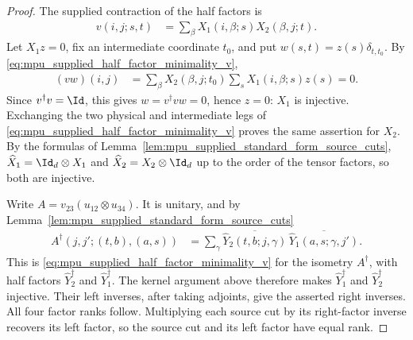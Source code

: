 \begin{proof}\leanok
    The supplied contraction of the half factors is
    \begin{align}
        v(i,j;s,t) & =\sum_\beta X_1(i,\beta;s)X_2(\beta,j;t).
        \label{eq:mpu_supplied_half_factor_minimality_v}
    \end{align}
    Let $X_1z=0$, fix an intermediate coordinate $t_0$, and put
    $w(s,t)=z(s)\delta_{t,t_0}$. By
    \eqref{eq:mpu_supplied_half_factor_minimality_v},
    \begin{align}
        (vw)(i,j) & =\sum_\beta X_2(\beta,j;t_0)
        \sum_sX_1(i,\beta;s)z(s)=0.
    \end{align}
    Since $v^\dagger v=\Id$, this gives $w=v^\dagger vw=0$, hence $z=0$:
    $X_1$ is injective. Exchanging the two physical and intermediate legs
    of \eqref{eq:mpu_supplied_half_factor_minimality_v} proves the same
    assertion for $X_2$. By the formulas of
    Lemma~\ref{lem:mpu_supplied_standard_form_source_cuts},
    $\widehat X_1=\Id_d\otimes X_1$ and $\widehat X_2=X_2\otimes\Id_d$
    up to the order of the tensor factors, so both are injective.

    Write $A=v_{23}(u_{12}\otimes u_{34})$. It is unitary, and by
    Lemma~\ref{lem:mpu_supplied_standard_form_source_cuts}
    \begin{align}
        A^\dagger(j,j';(t,b),(a,s))
         & =\sum_\gamma\overline{\widehat Y_2(t,b;j,\gamma)}\,
        \overline{\widehat Y_1(a,s;\gamma,j')}.
    \end{align}
    This is \eqref{eq:mpu_supplied_half_factor_minimality_v} for the
    isometry $A^\dagger$, with half factors $\widehat Y_2^\dagger$ and
    $\widehat Y_1^\dagger$. The kernel argument above therefore makes
    $\widehat Y_1^\dagger$ and $\widehat Y_2^\dagger$ injective.
    Their left inverses, after taking adjoints, give the asserted right
    inverses. All four factor ranks follow. Multiplying each source cut
    by its right-factor inverse recovers its left factor, so the source
    cut and its left factor have equal rank.
\end{proof}

